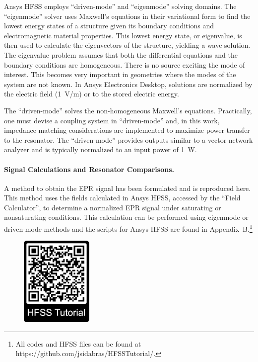 Ansys HFSS employs ``driven-mode'' and ``eigenmode'' solving domains. The ``eigenmode'' solver uses Maxwell's equations in their variational form to find the lowest energy states of a structure given its boundary conditions and electromagnetic material properties. \cite{sadiku2000numerical,jin2015finite} This lowest energy state, or eigenvalue, is then used to calculate the eigenvectors of the structure, yielding a wave solution. The eigenvalue problem assumes that both the differential equations and the boundary conditions are homogeneous. There is no source exciting the mode of interest. This becomes very important in geometries where the modes of the system are not known. In Ansys Electronics Desktop, solutions are normalized by the electric field (1~V/m) or to the stored electric energy.

The ``driven-mode'' solves the non-homogeneous Maxwell's equations. Practically, one must devise a coupling system in ``driven-mode'' and, in this work, impedance matching considerations are implemented to maximize power transfer to the resonator. The ``driven-mode'' provides outputs similar to a vector network analyzer and is typically normalized to an input power of 1~W. 

\paragraph*{Signal Calculations and Resonator Comparisons.}
A method to obtain the EPR signal has been formulated and is reproduced here. \cite{misrabook} This method uses the fields calculated in Ansys HFSS, accessed by the ``Field Calculator'', to determine a normalized EPR signal under saturating or nonsaturating conditions. This calculation can be performed using eigenmode or driven-mode methods and the scripts for Ansys HFSS are found in Appendix~B.\footnote{All codes and HFSS files can be found at https://github.com/jsidabras/HFSSTutorial/.} 

\begin{figure}
\centering
\includegraphics[width=3.5cm]{Kapitel/Appendix/HFSSTutQR.eps}
\end{figure}

